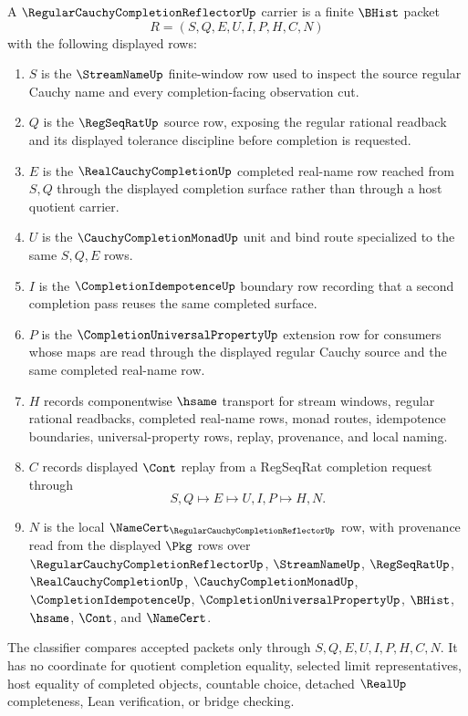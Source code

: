 \begin{definition}
\label{def:regular-cauchy-completion-reflector-carrier}
A $\RegularCauchyCompletionReflectorUp$ carrier is a finite $\BHist$ packet
$$
R=(S,Q,E,U,I,P,H,C,N)
$$
with the following displayed rows:
\begin{enumerate}
\item $S$ is the $\StreamNameUp$ finite-window row used to inspect the source regular Cauchy name and every completion-facing observation cut.
\item $Q$ is the $\RegSeqRatUp$ source row, exposing the regular rational readback and its displayed tolerance discipline before completion is requested.
\item $E$ is the $\RealCauchyCompletionUp$ completed real-name row reached from $S,Q$ through the displayed completion surface rather than through a host quotient carrier.
\item $U$ is the $\CauchyCompletionMonadUp$ unit and bind route specialized to the same $S,Q,E$ rows.
\item $I$ is the $\CompletionIdempotenceUp$ boundary row recording that a second completion pass reuses the same completed surface.
\item $P$ is the $\CompletionUniversalPropertyUp$ extension row for consumers whose maps are read through the displayed regular Cauchy source and the same completed real-name row.
\item $H$ records componentwise $\hsame$ transport for stream windows, regular rational readbacks, completed real-name rows, monad routes, idempotence boundaries, universal-property rows, replay, provenance, and local naming.
\item $C$ records displayed $\Cont$ replay from a RegSeqRat completion request through
$$
S,Q \longmapsto E \longmapsto U,I,P \longmapsto H,N .
$$
\item $N$ is the local $\NameCert_{\RegularCauchyCompletionReflectorUp}$ row, with provenance read from the displayed $\Pkg$ rows over $\RegularCauchyCompletionReflectorUp$, $\StreamNameUp$, $\RegSeqRatUp$, $\RealCauchyCompletionUp$, $\CauchyCompletionMonadUp$, $\CompletionIdempotenceUp$, $\CompletionUniversalPropertyUp$, $\BHist$, $\hsame$, $\Cont$, and $\NameCert$.
\end{enumerate}
The classifier compares accepted packets only through $S,Q,E,U,I,P,H,C,N$. It has no coordinate for quotient completion equality, selected limit representatives, host equality of completed objects, countable choice, detached $\RealUp$ completeness, Lean verification, or bridge checking.
\end{definition}

